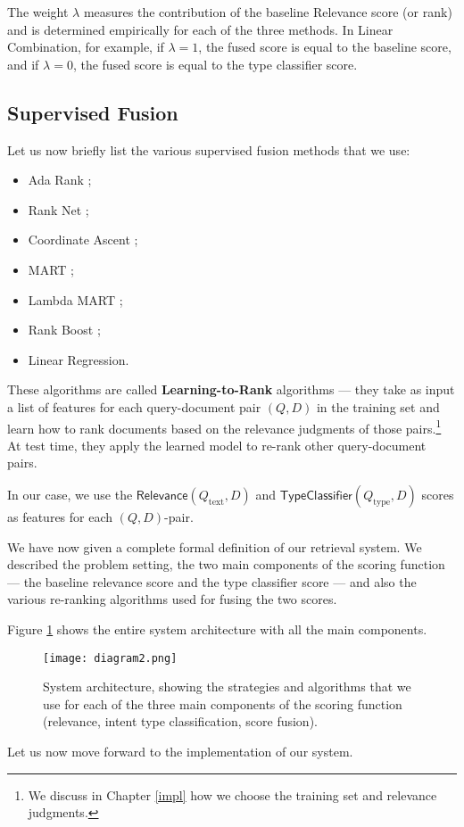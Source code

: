 The weight $\lambda$ measures the contribution of the baseline \textsf{Relevance} score (or rank) and
is determined empirically for each of the three methods.
In Linear Combination, for example, if $\lambda=1$, the fused score is equal to the baseline score,
and if $\lambda=0$, the fused score is equal to the type classifier score.

\subsection{Supervised Fusion}\label{sup-fusion}
Let us now briefly list the various supervised fusion methods that we use:
\begin{itemize}
 \item {Ada Rank} \cite{adaRank};
 \item {Rank Net} \cite{rankNet};
 \item {Coordinate Ascent} \cite{coordAscent};
 \item {MART} \cite{mart};
 \item {Lambda MART} \cite{lambda-mart};
 \item {Rank Boost} \cite{rankBoost};
  \item {Linear Regression}.
\end{itemize}

These algorithms are called \textbf{Learning-to-Rank} algorithms ---
they take as input a list of features for each query-document pair $(Q,D)$ in the training
set and learn how to rank documents based on the
relevance judgments of those pairs.\footnote{We discuss in Chapter \ref{impl} how we choose the training set and relevance judgments.}
At test time, they apply the learned model to re-rank other query-document pairs.

In our case, we use the $\textsf{Relevance}(Q_{\text{text}},D)$ and $\textsf{TypeClassifier}(Q_{\text{type}}, D)$
scores as features for each $(Q,D)$-pair.

We have now given a complete formal definition of our retrieval system. We described the problem setting,
the two main components of the scoring function --- the baseline relevance score and the type classifier score ---
and also the various re-ranking algorithms used for fusing the two scores.

Figure \ref{diagram2} shows the entire system architecture with all the main components.

\begin{figure}
\centerline{
  \texttt{[image: diagram2.png]}
  }
  \caption{System architecture, showing the strategies and algorithms that we use for each of the
  three main components of the scoring function (relevance, intent type classification, score fusion).}
  \label{diagram2}
\end{figure}

Let us now move forward to the implementation of our system.


